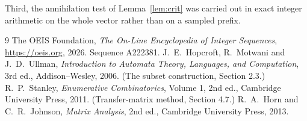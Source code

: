 \documentclass[11pt,a4paper]{article}
\theoremstyle{plain}
\theoremstyle{definition}
\begin{document}
Third, the annihilation test of Lemma~\ref{lem:crit} was carried out in exact integer
arithmetic on the whole vector rather than on a sampled prefix.

\begin{thebibliography}{9}
 The OEIS Foundation, \emph{The On-Line Encyclopedia of Integer
Sequences}, \url{https://oeis.org}, 2026. Sequence A222381.
 J.~E.~Hopcroft, R.~Motwani and J.~D.~Ullman, \emph{Introduction to Automata
Theory, Languages, and Computation}, 3rd ed., Addison--Wesley, 2006. (The subset
construction, Section 2.3.)
 R.~P.~Stanley, \emph{Enumerative Combinatorics}, Volume 1, 2nd ed.,
Cambridge University Press, 2011. (Transfer-matrix method, Section 4.7.)
 R.~A.~Horn and C.~R.~Johnson, \emph{Matrix Analysis}, 2nd ed., Cambridge
University Press, 2013.
\end{thebibliography}
\end{document}

